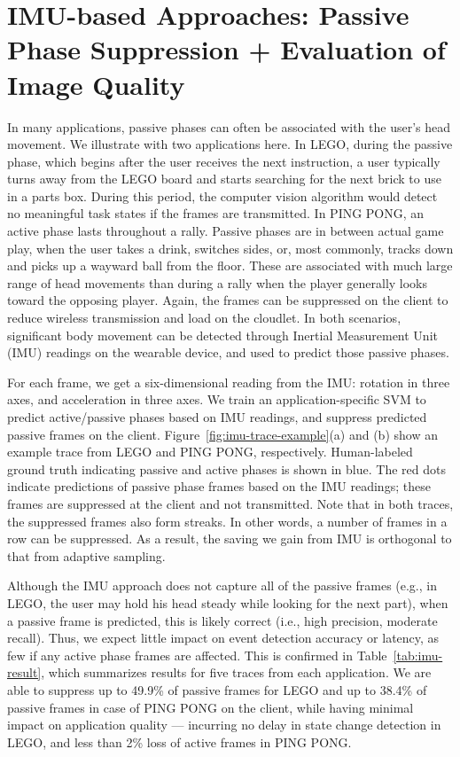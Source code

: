 \section{IMU-based Approaches: Passive Phase Suppression + Evaluation of Image Quality}

In many applications, passive phases can often be associated with the
user's head movement. We illustrate with two applications here. In
LEGO, during the passive phase, which begins after the user receives
the next instruction, a user typically turns away from the LEGO board
and starts searching for the next brick to use in a parts box. During
this period, the computer vision algorithm would detect no meaningful
task states if the frames are transmitted.  In PING PONG, an active
phase lasts throughout a rally.  Passive phases are in between actual
game play, when the user takes a drink, switches sides, or, most
commonly, tracks down and picks up a wayward ball from the floor.
These are associated with much large range of head movements than
during a rally when the player generally looks toward the opposing
player.  Again, the frames can be suppressed on the client to reduce
wireless transmission and load on the cloudlet.  In both scenarios,
significant body movement can be detected through Inertial Measurement
Unit (IMU) readings on the wearable device, and used to predict those
passive phases.

For each frame, we get a six-dimensional reading from the IMU:
rotation in three axes, and acceleration in three axes.  We train an
application-specific SVM to predict active/passive phases based on IMU
readings, and suppress predicted passive frames on the client.
Figure~\ref{fig:imu-trace-example}(a) and (b) show an example trace
from LEGO and PING PONG, respectively.  Human-labeled ground truth
indicating passive and active phases is shown in blue.  The red dots
indicate predictions of passive phase frames based on the IMU
readings; these frames are suppressed at the client and not
transmitted.  Note that in both traces, the suppressed frames also
form streaks. In other words, a number of frames in a row can be
suppressed. As a result, the saving we gain from IMU is orthogonal to
that from adaptive sampling.

Although the IMU approach does not capture all of the passive frames
(e.g., in LEGO, the user may hold his head steady while looking for
the next part), when a passive frame is predicted, this is likely
correct (i.e., high precision, moderate recall).  Thus, we expect
little impact on event detection accuracy or latency, as few if any
active phase frames are affected.  This is confirmed in
Table~\ref{tab:imu-result}, which summarizes results for five traces
from each application.  We are able to suppress up to 49.9\% of
passive frames for LEGO and up to 38.4\% of passive frames in case of
PING PONG on the client, while having minimal impact on application
quality --- incurring no delay in state change detection in LEGO, and
less than 2\% loss of active frames in PING PONG.


